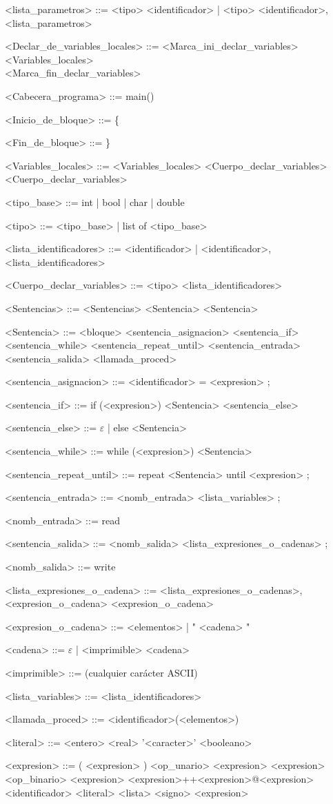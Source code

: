 \documentclass{scrartcl}
\begin{document}
\begin{grammar}
<lista_parametros> ::= <tipo> <identificador> | <tipo> <identificador>, <lista_parametros>

<Declar_de_variables_locales> ::= <Marca_ini_declar_variables> \\
<Variables_locales> \\
<Marca_fin_declar_variables>

<Cabecera_programa> ::= main()

<Inicio_de_bloque> ::= \{

<Fin_de_bloque> ::= \}

<Variables_locales> ::= <Variables_locales> <Cuerpo_declar_variables>
\alt <Cuerpo_declar_variables>

<tipo_base> ::= int | bool | char | double

<tipo> ::= <tipo_base> | list of <tipo_base>

<lista_identificadores> ::= <identificador> | <identificador>, <lista_identificadores>

<Cuerpo_declar_variables> ::= <tipo> <lista_identificadores>

<Sentencias> ::= <Sentencias> <Sentencia>
\alt <Sentencia>

<Sentencia> ::= <bloque>
\alt <sentencia_asignacion>
\alt <sentencia_if>
\alt <sentencia_while>
\alt <sentencia_repeat_until>
\alt <sentencia_entrada>
\alt <sentencia_salida>
\alt <llamada_proced>

<sentencia_asignacion> ::=  <identificador> = <expresion> ;

<sentencia_if> ::= if (<expresion>) <Sentencia> <sentencia_else>

<sentencia_else> ::= $\varepsilon$ | else <Sentencia>

<sentencia_while> ::= while (<expresion>) <Sentencia>

<sentencia_repeat_until> ::= repeat <Sentencia> until <expresion> ;

<sentencia_entrada> ::= <nomb_entrada> <lista_variables> ;

<nomb_entrada> ::= read

<sentencia_salida> ::= <nomb_salida> <lista_expresiones_o_cadenas> ;

<nomb_salida> ::= write

<lista_expresiones_o_cadena> ::= <lista_expresiones_o_cadenas>, <expresion_o_cadena>
\alt <expresion_o_cadena>

<expresion_o_cadena> ::= <elementos> | " <cadena> "

<cadena> ::= $\varepsilon$ | <imprimible> <cadena>

<imprimible> ::= (cualquier carácter ASCII)

<lista_variables> ::= <lista_identificadores>

<llamada_proced> ::= <identificador>(<elementos>)

<literal> ::= <entero> 
\alt <real> 
\alt '<caracter>' 
\alt <booleano> 

<expresion> ::= ( <expresion> )
\alt <op_unario> <expresion>
\alt <expresion> <op_binario> <expresion>
\alt <expresion>++<expresion>@<expresion>
\alt <identificador>
\alt <literal>
\alt <lista>
\alt <signo> <expresion>

\end{grammar}
\end{document}
